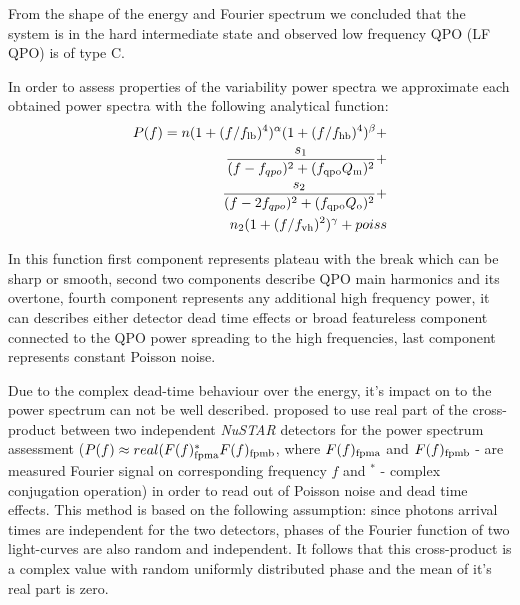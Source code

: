 \documentclass[a4paper,fleqn,usenatbib]{mnras}
\begin{document}
\begin{table}
    From the shape of the energy and Fourier spectrum we concluded that the system is in the hard intermediate state and observed low frequency QPO (LF QPO) is of type C. 

    In order to assess properties of the variability power spectra we approximate each obtained power spectra with the following analytical function:
\begin{equation}
        \begin{split}
        P(f) = n (1 + (f/f_{\rm lb})^4)^{\alpha} (1 + (f/f_{\rm hb})^4)^{\beta} + \\
        \frac{s_1}{(f - f_{qpo})^2 + (f_{\rm qpo} Q_{\rm m})^2} +\\
        \frac{s_2}{(f - 2f_{qpo})^2 + (f_{\rm qpo} Q_{\rm o})^2} + \\
        n_2 (1 + (f/f_{\rm vh})^2)^{\gamma} + poiss
\end{split}
        \label{eq:complex_fit}
\end{equation}


In this function first component represents plateau with the break which can be sharp or smooth, second two components describe QPO main harmonics and its overtone, fourth component represents any additional high frequency power, it can describes either detector dead time effects or broad featureless component connected to the QPO power spreading to the high frequencies, last component represents constant Poisson noise.

Due to the complex dead-time behaviour over the energy, it's impact on to the power spectrum can not be well described. 
\citet{2015ApJ...800..109B} proposed to use real part of the cross-product between two independent {\it NuSTAR} detectors for the power spectrum assessment ($P(f)\approx real(F(f)_{\rm fpma}^{*}F(f)_{\rm fpmb}$, where $F(f)_{\rm fpma}$ and $F(f)_{\rm fpmb}$ - are measured Fourier signal on corresponding frequency $f$ and $^{*}$ - complex conjugation operation) in order to read out of Poisson noise and dead time effects.
This method is based on the following assumption: since photons arrival times are independent for the two detectors, phases of the Fourier function of two light-curves are also random and independent.
It follows that this cross-product is a complex value with random uniformly distributed phase and the mean of it's real part is zero.


\end{table}
\end{document}

